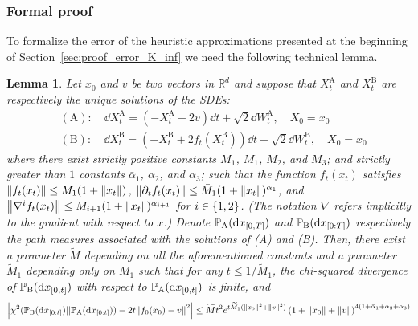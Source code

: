 \documentclass{article}
\theoremstyle{plain}
\newtheorem{lemma}[theorem]{Lemma}
\theoremstyle{definition}
\theoremstyle{remark}
\begin{document}
\subsubsection{Formal proof}
To formalize the error of the heuristic approximations presented at the beginning of Section~\ref{sec:proof_error_K_inf} we need the following technical lemma.
\newcommand{\xxa}{X^{\mathrm{A}}}
\newcommand{\xxb}{X^{\mathrm{B}}}
\newcommand{\wwa}{W^{\mathrm{A}}}
\newcommand{\wwb}{W^{\mathrm{B}}}
\newcommand{\wtm}{\widetilde M}
\newcommand{\ppa}{\P_{\mathrm{A}}}
\newcommand{\ppb}{\P_{\mathrm{B}}}
\newcommand{\xbzt}{\ppb(\dd x_{[0:t]})}
\newcommand{\xazt}{\ppa(\dd x_{[0:t]})}
\begin{lemma}
	\label{lem:chisq_fundamental_bound}
	Let $x_0$ and $v$ be two vectors in $\mathbb R^d$ and suppose that $\xxa_t$ and $\xxb_t$ are respectively the unique solutions of the SDEs:
	\begin{align*}
		 & \mathrm{(A):} \quad \dd \xxa_t = (-\xxa_t + 2v)\dd t + \sqrt 2 \dd \wwa_t, \quad X_0 = x_0          \\
		 & \mathrm{(B):} \quad \dd \xxb_t = (-\xxb_t+2f_t(\xxb_t)) \dd t + \sqrt 2 \dd \wwb_t, \quad X_0 = x_0
	\end{align*}
	where there exist strictly positive constants $M_1$, $\bar M_1$, $M_2$, and $M_3$; and strictly greater than $1$ constants $\bar \alpha_1$, $\alpha_2$, and $\alpha_3$; such that the function $f_t(x_t)$ satisfies $\norm{f_t(x_t)} \leq M_1(1+\norm{x_t})$, $\norm{\partial_t f_t(x_t)} \leq \bar M_1(1+\norm{x_t})^{\bar \alpha_1}$, and $\norm{\nabla^i f_t(x_t)} \leq M_{i+1}(1+\norm{x_t})^{\alpha_{i+1}}$ for $i \in \left\{ 1,2 \right\}$. (The notation $\nabla$ refers implicitly to the gradient with respect to $x$.) Denote $\ppa(\dd x_{[0,T]})$ and $\ppb(\dd x_{[0:T]})$ respectively the path measures associated with the solutions of (A) and (B). Then, there exist a parameter $\widetilde M$ depending on all the aforementioned constants and a parameter $\widetilde M_1$ depending only on $M_1$ such that for any $t \leq 1/\widetilde M_1$, the chi-squared divergence of $\ppb(\dd x_{[0,t]})$ with respect to $\ppa(\dd x_{[0,t]})$ is finite, and
	\begin{equation*}
		\abs{\chisquared{\xbzt}{\xazt}- 2t\norm{f_0(x_0) -v}^2} \leq \widetilde Mt^2 e^{t\widetilde M_1(\norm{x_0}^2 + \norm{v}^2)} \pr{1 + \norm{x_0} + \norm{v}}^{4(1+\bar\alpha_1 + \alpha_2 + \alpha_3)}
	\end{equation*}
\end{lemma}
\newcommand{\spito}[2]{\langle #1, #2 \rangle}
\end{document}
